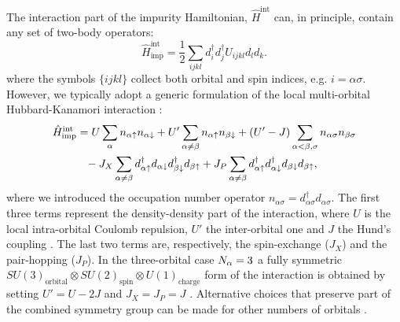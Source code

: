 \documentclass[edipack_sp.tex]{subfiles}
\begin{document}
The interaction part of the impurity Hamiltonian, 
 $\hat{H}^{\mathrm{int}}$ can, in principle, contain any 
set of two-body operators: 
\begin{equation}
\hat{H}^\mathrm{int}_\mathrm{imp} = \frac{1}{2} \sum_{ijkl} d^{\dagger}_{i}d^{\dagger}_{j}U_{ijkl}d_{l}d_{k}.\label{HintUmat}
\end{equation}
where the symbols $\{ijkl\}$ collect both orbital and spin indices, e.g.  $i=\alpha\sigma$.   
However, we typically 
adopt a generic formulation of the local multi-orbital Hubbard-Kanamori interaction \cite{Georges2013ARCMP}:
\begin{equation}\label{Hint}
  \begin{split}
    \hat{H}^\mathrm{int}_\mathrm{imp} &=U\sum_{\a}n_{\a\uparrow}n_{\a\downarrow}+U'\sum_{\a\neq \b}n_{\a\uparrow}n_{\b\downarrow}+(U'-J)\sum_{\a<\b,\sigma}n_{\a\sigma}n_{\b\sigma}\\
    &{\phantom =}- J_X\sum_{\a\neq
      \b}d^\dagger_{\a\uparrow}d_{\a\downarrow}d^\dagger_{\b\downarrow}d_{\b\uparrow}+J_P\sum_{\a
      \neq
      \b}d^\dagger_{\a\uparrow}d^\dagger_{\a\downarrow}d_{\b\downarrow}d_{\b\uparrow},\\
\end{split}
\end{equation}
where we introduced the occupation number operator $n_{\alpha\sigma}=d^\dagger_{\alpha\sigma}d_{\alpha\sigma}$.
The first three terms represent the density-density part of the
interaction, where $U$ is the local intra-orbital Coulomb repulsion,
$U'$ the inter-orbital one and $J$ the Hund's coupling \cite{Werner2008PRL,Werner2009PRB,Mravlje2011PRL,Medici2011PRL,Medici2011PRB,Georges2013ARCMP}.  
The last two terms are, respectively, the spin-exchange ($J_X$) and the pair-hopping ($J_P$).
In the three-orbital case $N_\alpha=3$ a fully symmetric $SU(3)_\mathrm{orbital}\otimes SU(2)_\mathrm{spin}\otimes
U(1)_\mathrm{charge}$ form of the interaction is obtained by setting $U'=U-2J$ and
$J_X=J_P=J$ \cite{Georges2013ARCMP}. Alternative choices that preserve part
of the combined symmetry group can be made for other numbers of orbitals \cite{Georges2013ARCMP}.
\end{document}
